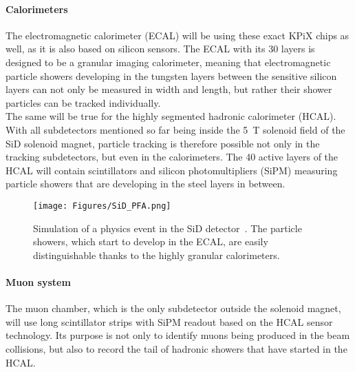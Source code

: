 \paragraph{Calorimeters}
The electromagnetic calorimeter (ECAL) will be using these exact KPiX chips as well, as it is also based on silicon sensors.
The ECAL with its 30 layers is designed to be a granular imaging calorimeter, meaning that electromagnetic particle showers developing in the tungsten layers between the sensitive silicon layers can not only be measured in width and length, but rather their shower particles can be tracked individually.
\\The same will be true for the highly segmented hadronic calorimeter (HCAL).
With all subdetectors mentioned so far being inside the \SI{5}{\tesla} solenoid field of the SiD solenoid magnet, particle tracking is therefore possible not only in the tracking subdetectors, but even in the calorimeters.
The 40 active layers of the HCAL will contain scintillators and silicon photomultipliers (SiPM) measuring particle showers that are developing in the steel layers in between.
\begin{figure}[h!]
\centering
\texttt{[image: Figures/SiD\_PFA.png]}
\caption[Visualization of the granulat SiD subdetectors]{Simulation of a physics event in the SiD detector~\cite{SiD_Update2}.
The particle showers, which start to develop in the ECAL, are easily distinguishable thanks to the highly granular calorimeters.}
\label{fig:SiD_PFA}
\end{figure}

\paragraph{Muon system}
The muon chamber, which is the only subdetector outside the solenoid magnet, will use long scintillator strips with SiPM readout based on the HCAL sensor technology.
Its purpose is not only to identify muons being produced in the beam collisions, but also to record the tail of hadronic showers that have started in the HCAL.

